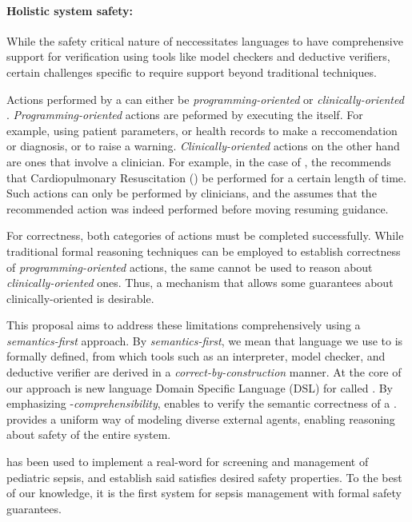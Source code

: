 \paragraph{Holistic system safety:}

While the safety critical nature of \CDSSs{} neccessitates
\CIG{} languages to have comprehensive support for verification using
tools like model checkers and deductive verifiers, certain challenges
specific to \CDSSs{} require support beyond traditional techniques.

Actions performed by a \CDSS{} can either be \emph{programming-oriented}
or \emph{clinically-oriented} \cite{BoxwalaJBI04}. \emph{Programming-oriented}
actions are peformed by executing the \CIG{} itself. For example,
using patient parameters, or health records to make a reccomendation or diagnosis,
or to raise a warning. \emph{Clinically-oriented} actions on the other hand
are ones that involve a clinician. For example, in the case of \ACLS{},
the \CDSS{} recommends that Cardiopulmonary Resuscitation (\CPR{}) be performed
for a certain length of time. Such actions can only be performed by clinicians,
and the \CDSS{} assumes that the recommended action was indeed performed before
moving resuming guidance.

For correctness, both categories of actions must be completed
successfully. While traditional formal reasoning techniques can be employed
to establish correctness of \emph{programming-oriented} actions, the same
cannot be used to reason about \emph{clinically-oriented} ones.
Thus, a mechanism that allows some guarantees about clinically-oriented is
desirable.

This proposal aims to address these limitations comprehensively
using a \emph{semantics-first} approach.
By \emph{semantics-first}, we mean that \CIG{} language we
use to is formally defined, from which tools such as an interpreter, model checker,
and deductive verifier are derived in a \emph{correct-by-construction}
manner. At the core of our approach is new language Domain Specific Language (DSL)
for \CIGs{} called \MediK{}. By emphasizing \HCP{}-\emph{comprehensibility},
\MediK{} enables \HCPs{} to verify the semantic correctness of a \CIG{}.
\MediK{} provides a uniform way of modeling diverse external agents, enabling reasoning about
safety of the entire system.

\MediK{} has been used to implement a real-word \CDSS{} for screening and
management of pediatric sepsis, and establish said \CDSS{} satisfies desired
safety properties. To the best of our knowledge, it is the first system
for sepsis management with formal safety guarantees.

